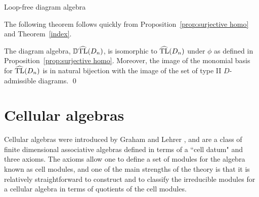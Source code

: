 \begin{section}{Loop-free diagram algebra}


The following theorem follows quickly from Proposition~\ref{prop:surjective homo} and Theorem~\ref{index}.
\begin{theorem}
The diagram algebra, $\operatorname{\mathbb{D}\widehat{TL}}(D_{n})$, is isomorphic to $\operatorname{\widehat{TL}}(D_{n})$ under $\phi$ as defined in Proposition~\ref{prop:surjective homo}. Moreover, the image of the monomial basis for $\operatorname{\widehat{TL}}(D_{n})$ is in natural bijection with the image of the set of type II $D$-admissible diagrams.
\qed
\end{theorem}

\end{section}

\section{Cellular algebras} \label{sec:cellular}
Cellular algebras were introduced by Graham and Lehrer \cite{Graham1996a}, and are a class of finite dimensional associative algebras defined in terms of a ``cell datum" and three axioms. The axioms allow one to define a set of modules for the algebra known as cell modules, and one of the main strengths of the theory is that it is relatively straightforward to construct and to classify the irreducible modules for a cellular algebra in terms of quotients of the cell modules. 

